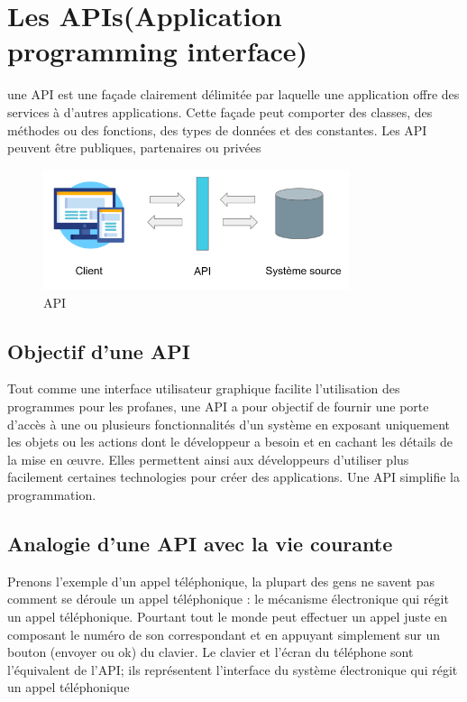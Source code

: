 \section{Les APIs(Application programming interface)}
une API est une façade clairement délimitée par laquelle une application offre des services à d’autres applications. Cette façade peut comporter des classes, des méthodes ou des fonctions, des types de données et
des constantes. Les API peuvent être publiques, partenaires ou privées
 \begin{figure}[H]
            \centering
                \includegraphics[width=0.8\textwidth]{Figures/api}
	       \decoRule
		\caption[API]{API}
	\label{fig:api}
	\end{figure}
\subsection{Objectif d’une API}
Tout comme une interface utilisateur graphique facilite l’utilisation des programmes pour les profanes, une
API a pour objectif de fournir une porte d’accès à une ou plusieurs fonctionnalités d’un système en exposant
uniquement les objets ou les actions dont le développeur a besoin et en cachant les détails de la mise en
œuvre. Elles permettent ainsi aux développeurs d’utiliser plus facilement certaines technologies pour créer
des applications. Une API simplifie la programmation.



\subsection{Analogie d’une API avec la vie courante}

Prenons l’exemple d’un appel téléphonique, la plupart des gens ne savent pas comment se déroule un appel
téléphonique : le mécanisme électronique qui régit un appel téléphonique. Pourtant tout le monde peut
effectuer un appel juste en composant le numéro de son correspondant et en appuyant simplement sur
un bouton (envoyer ou ok) du clavier. Le clavier et l’écran du téléphone sont l’équivalent de l’API; ils
représentent l’interface du système électronique qui régit un appel téléphonique

